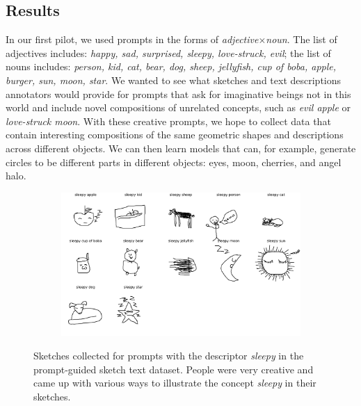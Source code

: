 
\subsection{Results}
In our first pilot, we used prompts in the forms of \textit{adjective}$\times$\textit{noun}. 
The list of adjectives includes: \textit{happy, sad, surprised, sleepy, love-struck, evil}; the list of nouns includes: 
\textit{person, kid, cat, bear, dog, sheep, jellyfish, cup of boba, apple, burger, sun, moon, star}. 
We wanted to see what sketches and text descriptions annotators would provide for prompts that ask for imaginative beings not in this world and include novel compositions of unrelated concepts, such as \textit{evil apple} or \textit{love-struck moon}. 
With these creative prompts, we hope to collect data that contain interesting compositions of the same geometric shapes and descriptions across different objects. 
We can then learn models that can, for example, generate circles to be different parts in different objects: eyes, moon, cherries, and angel halo. 

\begin{figure}[!htb]
\begin{subfigure}{\textwidth}
\centering
\includegraphics[width=\linewidth]{data_collection/v1_sleepy_sketches.png}  
\end{subfigure}
\caption{Sketches collected for prompts with the descriptor \textit{sleepy} in the prompt-guided sketch text dataset. People were very creative and came up with various ways to illustrate the concept \textit{sleepy} in their sketches.}
\label{v1.sleepy}
\end{figure}

